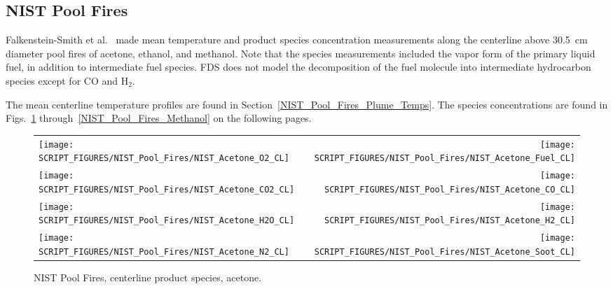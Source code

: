 \clearpage

\subsection{NIST Pool Fires}
\label{sec:NIST_Pool_Fires}

Falkenstein-Smith et al.~\cite{Falkenstein-Smith:2019} made mean temperature and product species concentration measurements along the centerline above 30.5~cm diameter pool fires of acetone, ethanol, and methanol. Note that the species measurements included the vapor form of the primary liquid fuel, in addition to intermediate fuel species. FDS does not model the decomposition of the fuel molecule into intermediate hydrocarbon species except for CO and H$_2$.

The mean centerline temperature profiles are found in Section~\ref{NIST_Pool_Fires_Plume_Temps}. The species concentrations are found in Figs.~\ref{NIST_Pool_Fires_Acetone} through~\ref{NIST_Pool_Fires_Methanol} on the following pages.

\begin{figure}[p]
\begin{tabular*}{\textwidth}{l@{\extracolsep{\fill}}r}
\texttt{[image: SCRIPT\_FIGURES/NIST\_Pool\_Fires/NIST\_Acetone\_O2\_CL]} &
\texttt{[image: SCRIPT\_FIGURES/NIST\_Pool\_Fires/NIST\_Acetone\_Fuel\_CL]} \\
\texttt{[image: SCRIPT\_FIGURES/NIST\_Pool\_Fires/NIST\_Acetone\_CO2\_CL]} &
\texttt{[image: SCRIPT\_FIGURES/NIST\_Pool\_Fires/NIST\_Acetone\_CO\_CL]}    \\
\texttt{[image: SCRIPT\_FIGURES/NIST\_Pool\_Fires/NIST\_Acetone\_H2O\_CL]} &
\texttt{[image: SCRIPT\_FIGURES/NIST\_Pool\_Fires/NIST\_Acetone\_H2\_CL]} \\
\texttt{[image: SCRIPT\_FIGURES/NIST\_Pool\_Fires/NIST\_Acetone\_N2\_CL]} &
\texttt{[image: SCRIPT\_FIGURES/NIST\_Pool\_Fires/NIST\_Acetone\_Soot\_CL]}
\end{tabular*}
\caption[NIST Pool Fires, centerline product species, acetone]{NIST Pool Fires, centerline product species, acetone.}
\label{NIST_Pool_Fires_Acetone}
\end{figure}

